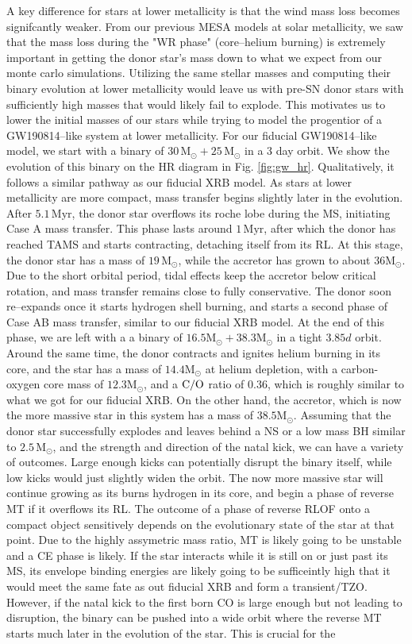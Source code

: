 \documentclass[linenumbers,trackchanges,twocolumn]{aastex701}
\newcommand{\Mdot}{\mathrm{M}_{\odot}}
\begin{document}
A key difference for stars at lower metallicity is that the wind mass loss becomes signifcantly weaker. From our previous MESA models at solar metallicity, we saw that the mass loss during the "WR phase" (core--helium burning) is extremely important in getting the donor star's mass down to what we expect from our monte carlo simulations. Utilizing the same stellar masses and computing their binary evolution at lower metallicity would leave us with pre-SN donor stars with sufficiently high masses that would likely fail to explode. This motivates us to lower the initial masses of our stars while trying to model the progentior of a GW190814--like system at lower metallicity. For our fiducial GW190814--like model, we start with a binary of $30\,\Mdot+25\,\Mdot$ in a 3 day orbit. We show the evolution of this binary on the HR diagram in Fig. \ref{fig:gw_hr}. Qualitatively, it follows a similar pathway as our fiducial XRB model. As stars at lower metallicity are more compact, mass transfer begins slightly later in the evolution. After $5.1 \,\mathrm{Myr}$, the donor star overflows its roche lobe during the MS, initiating Case A mass transfer. This phase lasts around $1 \,\mathrm{Myr}$, after which the donor has reached TAMS and starts contracting, detaching itself from its RL. At this stage, the donor star has a mass of $19\,\Mdot$, while the accretor has grown to about $36\Mdot$. Due to the short orbital period, tidal effects keep the accretor below critical rotation, and mass transfer remains close to fully conservative. The donor soon re--expands once it starts hydrogen shell burning, and starts a second phase of Case AB mass transfer, similar to our fiducial XRB model. At the end of this phase, we are left with a a binary of $16.5\Mdot+38.3\Mdot$ in a tight $3.85d$ orbit. Around the same time, the donor contracts and ignites helium burning in its core, and the star has a mass of $14.4\Mdot$ at helium depletion, with a carbon-oxygen core mass of $12.3\Mdot$, and a $\rm C/O$ ratio of $0.36$, which is roughly similar to what we got for our fiducial XRB. On the other hand, the accretor, which is now the more massive star in this system has a mass of $38.5\Mdot$. Assuming that the donor star successfully explodes and leaves behind a NS or a low mass BH similar to $2.5\,\Mdot$, and the strength and direction of the natal kick, we can have a variety of outcomes. Large enough kicks can potentially disrupt the binary itself, while low kicks would just slightly widen the orbit. The now more massive star will continue growing as its burns hydrogen in its core, and begin a phase of reverse MT if it overflows its RL. The outcome of a phase of reverse RLOF onto a compact object sensitively depends on the evolutionary state of the star at that point. Due to the highly assymetric mass ratio, MT is likely going to be unstable and a CE phase is likely. If the star interacts while it is still on or just past its MS, its envelope binding energies are likely going to be sufficeintly high that it would meet the same fate as out fiducial XRB and form a transient/TZO. However, if the natal kick to the first born CO is large enough but not leading to disruption, the binary can be pushed into a wide orbit where the reverse MT starts much later in the evolution of the star. This is crucial for the 
\end{document}

